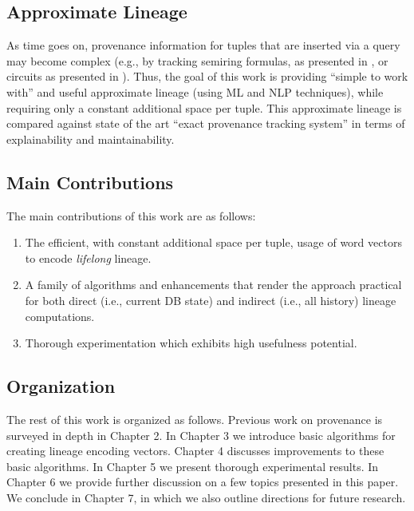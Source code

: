 \subsection*{Approximate Lineage}
As time goes on, provenance information for tuples that are inserted via a query may become complex (e.g., by tracking semiring formulas, as presented in \cite{green2007provenance}, or circuits as presented  in \cite{Deutch2014, Senellart2017}). Thus, the goal of this work is providing ``simple to work with'' and useful approximate lineage (using ML and NLP techniques), while requiring only a constant additional space per tuple. This approximate lineage is compared against state of the art ``exact provenance tracking system'' in terms of explainability and maintainability.\\


\subsection*{Main Contributions}
\par The main contributions of this work are as follows:
\begin{enumerate}
    \item The efficient, with constant additional space per tuple, usage of word vectors to encode \textit{lifelong} lineage.
    \item A family of algorithms and enhancements that render the approach practical for both direct (i.e., current DB state) and indirect (i.e., all history) lineage computations.
    \item Thorough experimentation which exhibits high usefulness potential.
\end{enumerate}


\subsection*{Organization}
The rest of this work is organized as follows.
Previous work on provenance is surveyed in depth in Chapter 2.
In Chapter 3 we introduce basic algorithms for creating lineage encoding vectors.
Chapter 4 discusses improvements to these basic algorithms.
In Chapter 5 we present thorough experimental results.
In Chapter 6 we provide further discussion on a few topics presented in this paper.
We conclude in Chapter 7, in which we also outline directions for future research.



